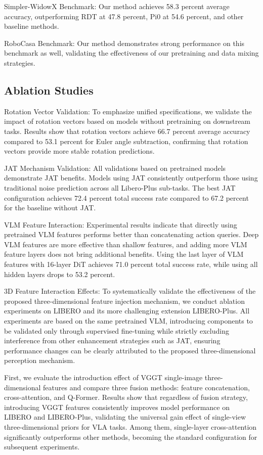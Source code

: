\documentclass[11pt,a4paper]{article}
\begin{document}
Simpler-WidowX Benchmark: Our method achieves 58.3 percent average accuracy, outperforming RDT at 47.8 percent, Pi0 at 54.6 percent, and other baseline methods.

RoboCasa Benchmark: Our method demonstrates strong performance on this benchmark as well, validating the effectiveness of our pretraining and data mixing strategies.

\subsection{Ablation Studies}

Rotation Vector Validation: To emphasize unified specifications, we validate the impact of rotation vectors based on models without pretraining on downstream tasks. Results show that rotation vectors achieve 66.7 percent average accuracy compared to 53.1 percent for Euler angle subtraction, confirming that rotation vectors provide more stable rotation predictions.

JAT Mechanism Validation: All validations based on pretrained models demonstrate JAT benefits. Models using JAT consistently outperform those using traditional noise prediction across all Libero-Plus sub-tasks. The best JAT configuration achieves 72.4 percent total success rate compared to 67.2 percent for the baseline without JAT.

VLM Feature Interaction: Experimental results indicate that directly using pretrained VLM features performs better than concatenating action queries. Deep VLM features are more effective than shallow features, and adding more VLM feature layers does not bring additional benefits. Using the last layer of VLM features with 16-layer DiT achieves 71.0 percent total success rate, while using all hidden layers drops to 53.2 percent.

3D Feature Interaction Effects: To systematically validate the effectiveness of the proposed three-dimensional feature injection mechanism, we conduct ablation experiments on LIBERO and its more challenging extension LIBERO-Plus. All experiments are based on the same pretrained VLM, introducing components to be validated only through supervised fine-tuning while strictly excluding interference from other enhancement strategies such as JAT, ensuring performance changes can be clearly attributed to the proposed three-dimensional perception mechanism.

First, we evaluate the introduction effect of VGGT single-image three-dimensional features and compare three fusion methods: feature concatenation, cross-attention, and Q-Former. Results show that regardless of fusion strategy, introducing VGGT features consistently improves model performance on LIBERO and LIBERO-Plus, validating the universal gain effect of single-view three-dimensional priors for VLA tasks. Among them, single-layer cross-attention significantly outperforms other methods, becoming the standard configuration for subsequent experiments.
\end{document}
